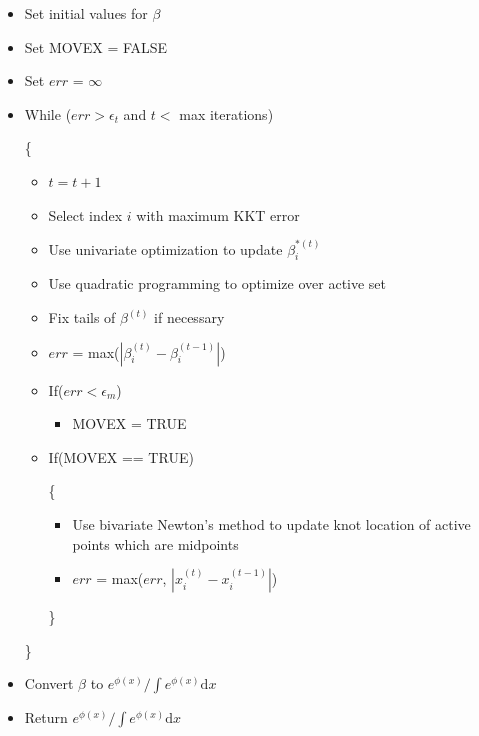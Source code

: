 	\begin{itemize}
	
		\item Set initial values for $\beta$ 
		
		\item Set MOVEX = FALSE
		
		\item Set $err$ = $\infty$

		
		\item While ($err > \epsilon_t$ and $t <$ max iterations)
		
		\{
		
			\begin{itemize}
			
			\item $t = t + 1$
										
			\item Select index $i$ with maximum KKT error 
			
			\item Use univariate optimization to update $\beta_i^{*(t)}$
						
			\item Use quadratic programming to optimize over active set
			
			\item Fix tails of $\beta^{(t)}$ if necessary
						
			\item $err$ =  max($| \beta_i^{(t)} - \beta_i^{(t-1)}|$) 
			
			\item If($err < \epsilon_m$)
				
				\begin{itemize}
				
				\item MOVEX = TRUE
				
				\end{itemize}
			
			\item If(MOVEX == TRUE)
				
				\{
				
				\begin{itemize}
										
				\item Use bivariate Newton's method to update knot location of active points which are midpoints
				
				\item $err$ =  max($err$, $| x_i^{(t)} - x_i^{(t-1)}|$) 
				
				\end{itemize}
			
				\}
						
			\end{itemize}
			
	\}
	
	\item Convert $\beta$ to $e^{\phi(x)} / \int e ^ {\phi(x)} \mathrm{d}x$
	
	\item Return $e^{\phi(x)} / \int e ^ {\phi(x)}\mathrm{d}x$
	
	\end{itemize}
	
